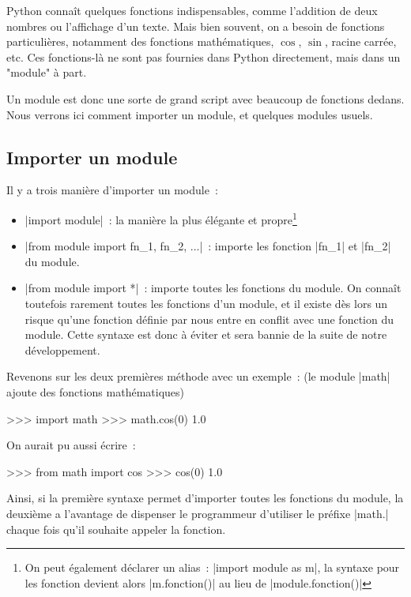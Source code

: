 		Python connaît quelques fonctions indispensables, comme l'addition de deux nombres ou l'affichage d'un texte. Mais bien souvent,
		on a besoin de fonctions particulières, notamment des fonctions mathématiques, $\cos$, $\sin$, racine carrée, etc.
		Ces fonctions-là ne sont pas fournies dans Python directement, mais dans un "module" à part.
		
		Un module est donc une sorte de grand script avec beaucoup de fonctions dedans. Nous verrons ici comment importer un module, et quelques modules usuels.
	
	\subsection{Importer un module}
		
		Il y a trois manière d'importer un module~:
		\begin{itemize}
			\item \python|import module|~: la manière la plus élégante et propre\footnote{On peut également déclarer un alias~: \python|import module as m|, la syntaxe pour les fonction devient alors \python|m.fonction()| au lieu de \python|module.fonction()|}
			\item \python|from module import fn_1, fn_2, ...|~: importe les fonction \python|fn_1| et \python|fn_2| du module.
			\item \python|from module import *|~: importe toutes les fonctions du module. On connaît toutefois rarement toutes les fonctions d'un module, et il existe dès lors un risque qu'une fonction définie par nous entre en conflit avec une fonction du module. Cette syntaxe est donc à éviter et sera bannie de la suite de notre développement.
		\end{itemize}
		
		Revenons sur les deux premières méthode avec un exemple~: (le module \python|math| ajoute des fonctions mathématiques)
		\begin{pythoncode}
			>>> import math
			>>> math.cos(0)
			1.0
		\end{pythoncode}
		
		On aurait pu aussi écrire~:
		\begin{pythoncode}
			>>> from math import cos
			>>> cos(0)
			1.0
		\end{pythoncode}

		Ainsi, si la première syntaxe permet d'importer toutes les fonctions du module, la deuxième a l'avantage de dispenser le programmeur d'utiliser le préfixe \python|math.| chaque fois qu'il souhaite appeler la fonction.
	
